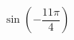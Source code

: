 \begin{ex}[type=calculate]
	\begin{condition}
		\( \sin\left( -\dfrac{11\pi}{4}  \right)\)
	\end{condition}
\end{ex}